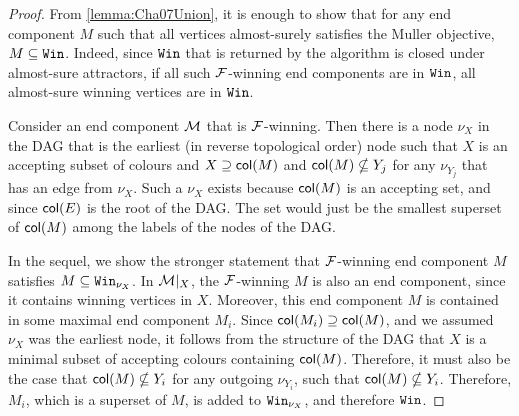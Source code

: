 \begin{proof}
    From \cref{lemma:Cha07Union}, it is enough to show that for any end component $M$ such that all vertices almost-surely satisfies the Muller objective, $M\subseteq \texttt{Win}$. Indeed, since $\texttt{Win}$ that is returned by the algorithm is closed under almost-sure attractors, if all such $\mathcal{F}$-winning end components are in $\texttt{Win}$, all almost-sure winning vertices are in $\texttt{Win}$.
    
    Consider an end component $\mathcal{M}$ that is $\mathcal{F}$-winning. Then there is a node $\nu_X$ in the DAG that is the earliest (in reverse topological order) node such that $X$ is an accepting subset of colours and $X\supseteq {\mathsf{col}}(M)$ and ${\mathsf{col}}(M)\nsubseteq Y_j$ for any $\nu_{Y_j}$ that has an edge from $\nu_X$. Such a $\nu_X$ exists because ${\mathsf{col}}(M)$ is an accepting set, and since ${\mathsf{col}}(E)$ is the root of the DAG. The set would just be the smallest superset of ${\mathsf{col}}(M)$ among the labels of the nodes of the DAG. 
    
    In the sequel, we show the stronger statement that $\mathcal{F}$-winning end component $M$ satisfies $M\subseteq \texttt{Win}_{\nu_X}$. 
    In $\mathcal{M}|_X$, the $\mathcal{F}$-winning $M$ is also an end component, since it contains winning vertices in $X$. Moreover, this end component $M$ is contained in some maximal end component $M_i$. Since ${\mathsf{col}}(M_i)\supseteq {\mathsf{col}}(M)$, and we assumed $\nu_X$ was the earliest node, it follows from the structure of the DAG that $X$ is a minimal subset of accepting colours containing ${\mathsf{col}}(M)$. Therefore, it must also be the case that ${\mathsf{col}}(M)\nsubseteq Y_i$ for any outgoing $\nu_{Y_i}$, such that ${\mathsf{col}}(M)\nsubseteq Y_i$. %
    Therefore, $M_i$, which is a superset of $M$, is added to $\texttt{Win}_{\nu_X}$, and therefore $\texttt{Win}$.
    


\end{proof}
